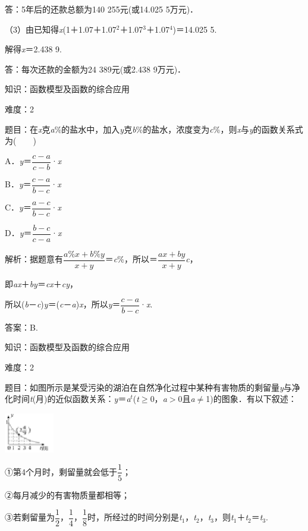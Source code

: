 \documentclass{article} %
\begin{document}
答：5年后的还款总额为140 255元(或14.025 5万元)．

（3）由已知得\textit{x}(1＋1.07＋1.07${}^{2}$＋1.07${}^{3}$＋1.07${}^{4}$)＝14.025 5.

解得\textit{x}＝2.438 9.

答：每次还款的金额为24 389元(或2.438 9万元)．

知识：函数模型及函数的综合应用

难度：2

题目：在\textit{x}克\textit{a}\%的盐水中，加入\textit{y}克\textit{b}\%的盐水，浓度变为\textit{c}\%，则\textit{x}与\textit{y}的函数关系式为(　　)

A．\textit{y}＝$\dfrac{c-a}{c-b}$·\textit{x}   

B．\textit{y}＝$\dfrac{c-a}{b-c}$·\textit{x}

C．\textit{y}＝$\dfrac{a-c}{b-c}$·\textit{x}   

D．\textit{y}＝$\dfrac{b-c}{c-a}$·\textit{x}

解析：据题意有$\dfrac{a\%x+b\%y}{x+y}$＝\textit{c}\%，所以＝$\dfrac{ax+by}{x+y}$\textit{c}，

即\textit{ax}＋\textit{by}＝\textit{cx}＋\textit{cy}，

所以(\textit{b}－\textit{c})\textit{y}＝(\textit{c}－\textit{a})\textit{x}，所以\textit{y}＝$\dfrac{c-a}{b-c}$·\textit{x}.

答案：B.

知识：函数模型及函数的综合应用

难度：2

题目：如图所示是某受污染的湖泊在自然净化过程中某种有害物质的剩留量\textit{y}与净化时间\textit{t}(月)的近似函数关系：\textit{y}＝\textit{a${}^{t}$}(\textit{t}$\mathrm{\ge}$0，\textit{a}$\mathrm{>}$0且\textit{a}$\mathrm{\neq}$1)的图象．有以下叙述：

\includegraphics*[width=0.86in, height=0.69in, keepaspectratio=false]{image77}

①第4个月时，剩留量就会低于$\dfrac{1}{5}$；

②每月减少的有害物质量都相等；

③若剩留量为$\dfrac{1}{2}$，$\dfrac{1}{4}$，$\dfrac{1}{8}$时，所经过的时间分别是\textit{t}${}_{1}$，\textit{t}${}_{2}$，\textit{t}${}_{3}$，则\textit{t}${}_{1}$＋\textit{t}${}_{2}$＝\textit{t}${}_{3}$.
\end{document}
